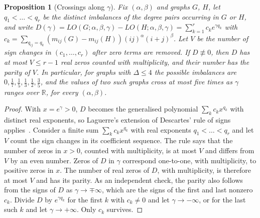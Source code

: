 \documentclass[a5paper, 10pt]{article}
\theoremstyle{plain}
\newtheorem{proposition}[theorem]{Proposition}
\theoremstyle{remark}
\theoremstyle{definition}
\begin{document}
  \begin{proposition}[Crossings along $\gamma$]\label{prop:laguerre}
  Fix $(\alpha,\beta)$ and graphs $G$, $H$, let
  $q_1 < \dots < q_r$ be the distinct imbalances of the degree pairs
  occurring in $G$ or $H$, and write
  $D(\gamma) = LO(G;\alpha,\beta,\gamma) - LO(H;\alpha,\beta,\gamma)
  = \sum_{k=1}^{r} c_k e^{\gamma q_k}$ with
  $c_k = \sum_{q_{ij} = q_k} (m_{ij}(G) - m_{ij}(H))(ij)^{\alpha}(i+j)^{\beta}$.
  Let $V$ be the number of sign changes in $(c_1,\dots,c_r)$ after
  zero terms are removed. If $D \not\equiv 0$, then $D$ has at most
  $V \le r - 1$ real zeros counted with multiplicity, and their number
  has the parity of $V$. In particular, for graphs with $\Delta \le 4$
  the possible imbalances are $0, \tfrac17, \tfrac15, \tfrac13,
  \tfrac12, \tfrac35$, and the values of two such graphs cross at most five times as
  $\gamma$ ranges over $\mathbb{R}$, for every $(\alpha,\beta)$.
  \end{proposition}

  \begin{proof}
  With $x = e^{\gamma} > 0$, $D$ becomes the generalised polynomial
  $\sum_k c_k x^{q_k}$ with distinct real exponents, so Laguerre's
  extension of Descartes' rule of signs applies~\cite{Jameson2006}.
  Consider a finite sum $\sum_k c_k x^{q_k}$ with real exponents
  $q_1 < \dots < q_r$ and let $V$ count the sign changes in its
  coefficient sequence. The rule says that the number of zeros in
  $x > 0$, counted with multiplicity, is at most $V$ and differs from
  $V$ by an even number. Zeros of
  $D$ in $\gamma$ correspond one-to-one, with multiplicity, to positive
  zeros in $x$. The
  number of real zeros of $D$, with multiplicity, is therefore at most $V$ and has
  its parity. As an independent check, the parity also follows from the signs of $D$
  as $\gamma \to \mp\infty$, which are the signs of the first and last nonzero $c_k$.
  Divide $D$ by $e^{\gamma q_k}$ for the first $k$ with $c_k \neq 0$ and
  let $\gamma \to -\infty$, or for the last such $k$ and let
  $\gamma \to +\infty$. Only $c_k$ survives.
  \end{proof}
\end{document}
